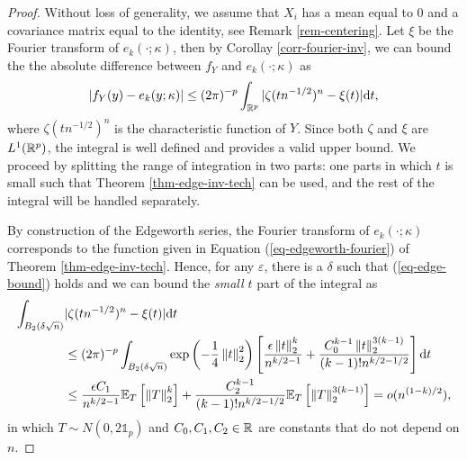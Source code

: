 \begin{proof}
    Without loss of generality, we assume that $X_i$ has a mean equal to 0 and a covariance matrix equal to the identity, see Remark \ref{rem-centering}. Let $\xi$ be the Fourier transform of $e_k(\cdot; \kappa)$, then by Corollay \ref{corr-fourier-inv}, we can bound the the absolute difference between $f_Y$ and $e_k(\cdot; \kappa)$ as
    \begin{equation*}
        |f_Y(y) - e_k(y; \kappa)| \leq (2\pi)^{-p}\intRp{t}{|\zeta(tn^{-1/2})^n - \xi(t)|},
    \end{equation*}
    where $\zeta(tn^{-1/2})^n$ is the characteristic function of $Y$. Since both $\zeta$ and $\xi$ are $L^1(\Rp)$, the integral is well defined and provides a valid upper bound. We proceed by splitting the range of integration in two parts: one parts in which $t$ is small such that Theorem \ref{thm-edge-inv-tech} can be used, and the rest of the integral will be handled separately.

    By construction of the Edgeworth series, the Fourier transform of $e_k(\cdot; \kappa)$ corresponds to the function given in Equation (\ref{eq-edgeworth-fourier}) of Theorem \ref{thm-edge-inv-tech}. Hence, for any $\varepsilon$, there is a $\delta$ such that (\ref{eq-edge-bound}) holds and we can bound the \textit{small $t$} part of the integral as
    \begin{align*}
        \int_{B_2(\delta\sqrt{n})} &|\zeta(tn^{-1/2})^n - \xi(t)| \d t\\
        &\leq (2\pi)^{-p}\int_{B_2(\delta\sqrt{n})}\expf{-\frac{1}{4}\norm{t}_2^2}\left[ \frac{\epsilon\norm{t}_2^k}{n^{k/2-1}} + \frac{C_0^{k-1}\norm{t}_2^{3(k-1)}}{(k-1)!n^{k/2-1/2}} \right] \d t \\
        &\leq \frac{\epsilon C_1}{n^{k/2-1}}\expec{T}{\norm{T}^k_2} + \frac{C_2^{k-1}}{(k-1)!n^{k/2-1/2}}\expec{T}{\norm{T}_2^{3(k-1)}}
        = o(n^{(1-k)/2}),
    \end{align*}
    in which $T \sim N(0, 2\mathbb{1}_p)$ and $C_0, C_1, C_2 \in \R$ are constants that do not depend on $n$. 


\end{proof}
